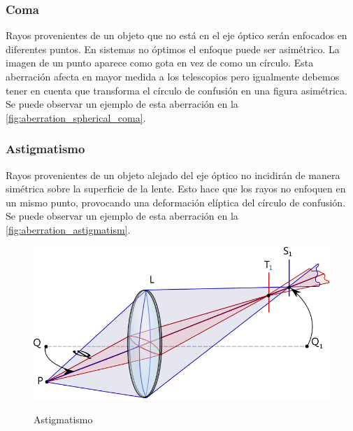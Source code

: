 \subsubsection{Coma}
Rayos provenientes de un objeto que no está en el eje óptico serán enfocados en diferentes puntos. En sistemas no óptimos el enfoque puede ser asimétrico. La imagen de un punto aparece como gota en vez de como un círculo. Esta aberración afecta en mayor medida a los telescopios pero igualmente debemos tener en cuenta que transforma el círculo de confusión en una figura asimétrica. Se puede observar un ejemplo de esta aberración en la \autoref{fig:aberration_spherical_coma}.

\subsubsection{Astigmatismo}
Rayos provenientes de un objeto alejado del eje óptico no incidirán de manera simétrica sobre la superficie de la lente. Esto hace que los rayos no enfoquen en un mismo punto, provocando una deformación elíptica del círculo de confusión. Se puede observar un ejemplo de esta aberración en la \autoref{fig:aberration_astigmatism}.
\begin{figure}[bth]
    \myfloatalign
        {\includegraphics[width=1.0\linewidth]{images/aberration_astigmatism}}
        \caption{Astigmatismo}
        \label{fig:aberration_astigmatism}
\end{figure}

